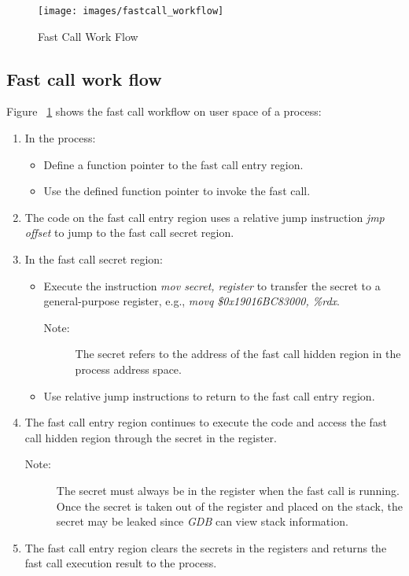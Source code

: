 \begin{figure}[tbp]
  \centering
  \texttt{[image: images/fastcall\_workflow]}
  \caption[Short description]{Fast Call Work Flow}
  \label{fig:fastcall_workflow}
\end{figure}
\subsection{Fast call work flow}
Figure ~\ref{fig:fastcall_workflow} shows the fast call workflow on user space of a process:
\begin{enumerate}
  \item In the process:
    \begin{itemize}
      \item Define a function pointer to the fast call entry region.
      \item Use the defined function pointer to invoke the fast call.
    \end{itemize}
  \item The code on the fast call entry region uses a relative jump instruction \emph{jmp offset} to jump to the fast call secret region.
  \item In the fast call secret region:  
    \begin{itemize}
      \item Execute the instruction \emph{mov secret, register} to transfer the secret to a general-purpose register,  e.g., \emph{movq \$0x19016BC83000, \%rdx}.
        \begin{description}
          \item[Note:] The secret refers to the address of the fast call hidden region in the process address space.
        \end{description}
      \item Use relative jump instructions to return to the fast call entry region.
    \end{itemize}
  \item The fast call entry region continues to execute the code and access the fast call hidden region through the secret in the register.
  \begin{description}
    \item[Note:] The secret must always be in the register when the fast call is running. 
    Once the secret is taken out of the register and placed on the stack, 
    the secret  may be leaked since \emph{GDB} can view stack information.
  \end{description}
  \item The fast call entry region clears the secrets in the registers and returns the fast call execution result to the process.
\end{enumerate}

